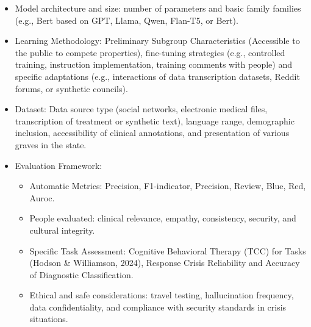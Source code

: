 \documentclass[journal]{IEEEtran}
\begin{document}
\begin{itemize}
    \item Model architecture and size: number of parameters and basic family families (e.g., Bert based on GPT, Llama, Qwen, Flan-T5, or Bert).
    \item Learning Methodology: Preliminary Subgroup Characteristics (Accessible to the public to compete properties), fine-tuning strategies (e.g., controlled training, instruction implementation, training comments with people) and specific adaptations (e.g., interactions of data transcription datasets, Reddit forums, or synthetic councils).  
    \item Dataset: Data source type (social networks, electronic medical files, transcription of treatment or synthetic text), language range, demographic inclusion, accessibility of clinical annotations, and presentation of various graves in the state.
    \item Evaluation Framework:  
    \begin{itemize}
        \item Automatic Metrics: Precision, F1-indicator, Precision, Review, Blue, Red, Auroc.
        \item People evaluated: clinical relevance, empathy, consistency, security, and cultural integrity.
        \item Specific Task Assessment: Cognitive Behavioral Therapy (TCC) for Tasks  (Hodson \& Williamson, 2024), Response Crisis Reliability and Accuracy of Diagnostic Classification.
        \item Ethical and safe considerations: travel testing, hallucination frequency, data confidentiality, and compliance with security standards in crisis situations.
    \end{itemize}
             
\end{itemize}
   
\end{document}
